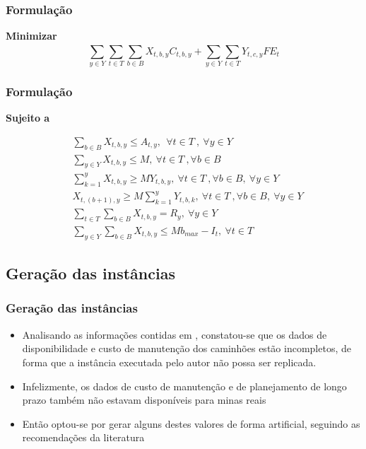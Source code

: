 \documentclass{beamer}
\begin{document}
\begin{frame}
\begin{columns}[c]
	\end{columns}
\end{frame}	

\begin{frame}
\frametitle{Formulação}

\textbf{Minimizar}
\begin{equation}
	\sum_{y \in Y}^{}\sum_{t \in T}^{}\sum_{b \in B}^{}X_{t,b,y}C_{t,b,y} + \sum_{y \in Y}^{}\sum_{t \in T}^{}Y_{t,c,y}FE_t 
\end{equation}
\end{frame}

\begin{frame}
	\frametitle{Formulação}
	\textbf{Sujeito a}
	\begin{small}
		\begin{align}
		&	\sum_{b \in B}^{}X_{t,b,y} \leq A_{t,y},\: \: \forall t \in T \:, \: \forall y\in Y \\
		&	\sum_{y \in Y}^{}X_{t,b,y} \leq M,\: \forall t \in T \:, \forall b \in B \\
		&	\sum_{k=1}^{y}X_{t,b,y} \geq MY_{t,b,y},\: \forall t \in T \:, \forall b \in B, \: \forall y\in Y \\
		&	X_{t,(b+1),y} \geq M \sum_{k=1}^{y}Y_{t,b,k},\: \forall t \in T \:, \forall b \in B, \: \forall y\in Y \\
		&	\sum_{t \in T}^{}\sum_{b \in B}^{}X_{t,b,y} = R_y ,\: \forall y \in Y \\
		&	\sum_{y \in Y}^{}\sum_{b \in B}^{}X_{t,b,y} \leq Mb_{max} - I_t ,\: \forall t \in T 
		\end{align}
	\end{small}
\end{frame}

\subsection{Geração das instâncias}
\begin{frame}
	\frametitle{Geração das instâncias}
	\begin{itemize}
		\item Analisando as informações contidas em \cite{topal2010a}, constatou-se que os dados de disponibilidade e custo de manutenção dos caminhões estão incompletos, de forma que a instância executada pelo autor não possa ser replicada.
		\item Infelizmente, os dados de custo de manutenção e de planejamento de longo prazo também não estavam disponíveis para minas reais
		\item Então optou-se por gerar alguns destes valores de forma artificial, seguindo as recomendações da literatura
	\end{itemize}
\end{frame}
\end{document}
